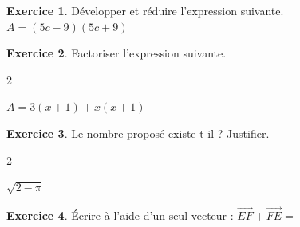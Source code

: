 \documentclass{exam}
\theoremstyle{definition}
\newtheorem{exercice}{Exercice}
\begin{document}
\large


\vspace{2mm}


\vspace{2mm}

\begin{exercice}

Développer et réduire l'expression suivante.
 $A = (5c-9)(5c+9)$
    \begin{center}
        \framebox[1\textwidth]{\parbox{5.5in}{
        \vspace{6em}}}
    \end{center}
\end{exercice}

\begin{exercice}

Factoriser l'expression suivante.\begin{multicols}{2}
 \begin{minipage}[t]{\linewidth} $A = 3(x+1)+x(x+1)$ \end{minipage}
\end{multicols}
    \begin{center}
        \framebox[1\textwidth]{\parbox{4.5in}{
        \vspace{6em}}}
    \end{center}
\end{exercice}

\begin{exercice}

 Le nombre proposé existe-t-il ? Justifier.\begin{multicols}{2}
 \begin{minipage}[t]{\linewidth} $\sqrt{2-\pi}$ \end{minipage}
\end{multicols}
	\framebox[1\textwidth]{\parbox{4.5in}{
	\vspace{6em}}}
\end{exercice}

\begin{exercice}


 Écrire à l'aide d'un seul vecteur :
        $\overrightarrow{EF}+\overrightarrow{FE}=${\makebox[5em]{\enspace\hrulefill}}
\end{exercice}
\end{document}

